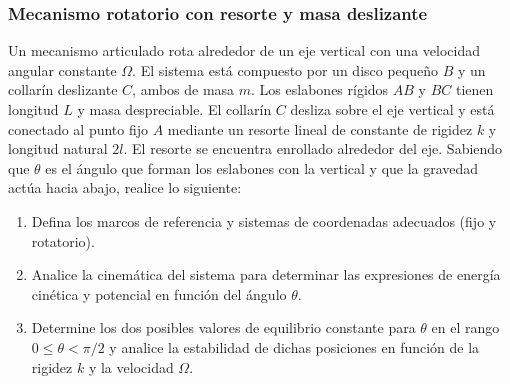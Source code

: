 \subsubsection{Mecanismo rotatorio con resorte y masa deslizante}

Un mecanismo articulado rota alrededor de un eje vertical con una velocidad angular constante $\Omega$. El sistema está compuesto por un disco pequeño $B$ y un collarín deslizante $C$, ambos de masa $m$. Los eslabones rígidos $AB$ y $BC$ tienen longitud $L$ y masa despreciable. El collarín $C$ desliza sobre el eje vertical y está conectado al punto fijo $A$ mediante un resorte lineal de constante de rigidez $k$ y longitud natural $2l$. El resorte se encuentra enrollado alrededor del eje. Sabiendo que $\theta$ es el ángulo que forman los eslabones con la vertical y que la gravedad actúa hacia abajo, realice lo siguiente:

\begin{enumerate}
    \item Defina los marcos de referencia y sistemas de coordenadas adecuados (fijo y rotatorio).
    \item Analice la cinemática del sistema para determinar las expresiones de energía cinética y potencial en función del ángulo $\theta$.
    \item Determine los dos posibles valores de equilibrio constante para $\theta$ en el rango $0 \le \theta < \pi/2$ y analice la estabilidad de dichas posiciones en función de la rigidez $k$ y la velocidad $\Omega$.
\end{enumerate}

